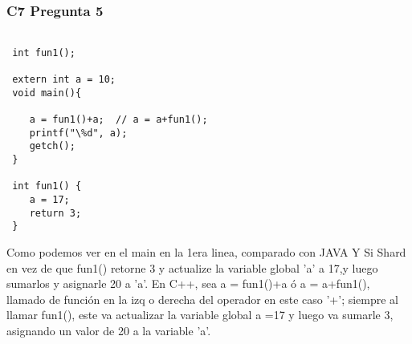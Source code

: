 \subsubsection{C7 Pregunta 5}
\begin{lstlisting}

 int fun1();
 
 extern int a = 10;
 void main(){
 	
 	a = fun1()+a;  // a = a+fun1();
 	printf("\%d", a);
 	getch();
 }
 
 int fun1() {
 	a = 17;
 	return 3;
 }
 \end{lstlisting}
Como podemos ver en el main en la 1era linea, comparado con JAVA Y Si Shard en vez de que fun1() retorne 3 y actualize la variable global 'a' a 17,y luego sumarlos y asignarle 20 a 'a'. En C++, sea a = fun1()+a  ó  a = a+fun1(), llamado de función en la izq o derecha del operador en este caso '+'; siempre al llamar fun1(), este va actualizar la variable global a =17 y luego va sumarle 3, asignando un valor de 20 a  la variable 'a'. 